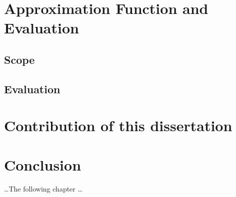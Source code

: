 
\section{Approximation Function and Evaluation}
\label{sec:approximation_function_and_evaluation}

\subsection{Scope}
\label{sub:scope}

\subsection{Evaluation}
\label{sub:evaluation}



\section{Contribution of this dissertation}
\label{sec:contribution_of_this_dissertation}


\section{Conclusion}
\label{sec:conclusion}
\ldots The following chapter \ldots
